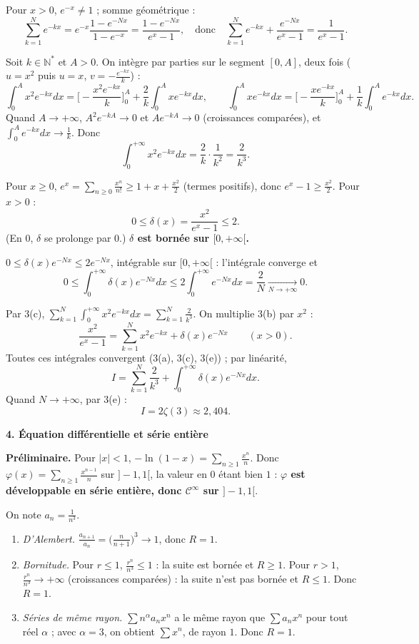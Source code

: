 \documentclass[a4paper,11pt]{article}
\numberwithin{equation}{section}
\numberwithin{figure}{section}
\numberwithin{table}{section}
\theoremstyle{enonce}
\theoremstyle{exemple}
\theoremstyle{remarque}
\newcommand{\N}{\mathbb{N}}
\newcommand{\Partie}[1]{\par\needspace{5\baselineskip}\vspace{1.1em}\noindent
  {\sffamily\bfseries\large\color{Bleu}#1}\par\vspace{2pt}{\color{Filet}\rule{\linewidth}{0.4pt}}\par\smallskip}
\newcommand{\Q}[1]{\par\needspace{3\baselineskip}\medskip\noindent{\sffamily\bfseries\color{Bleu}#1}\enspace}
\begin{document}
\Q{3(b)} Pour $x>0$, $e^{-x}\neq1$ ; somme géométrique :
\[\sum_{k=1}^Ne^{-kx}=e^{-x}\frac{1-e^{-Nx}}{1-e^{-x}}=\frac{1-e^{-Nx}}{e^x-1},\quad\text{donc}\quad
\sum_{k=1}^Ne^{-kx}+\frac{e^{-Nx}}{e^x-1}=\frac1{e^x-1}.\]

\Q{3(c)} Soit $k\in\N^*$ et $A>0$. On intègre par parties sur le segment $[0,A]$, deux fois ($u=x^2$ puis $u=x$, $v=-\frac{e^{-kx}}k$) :
\[\int_0^Ax^2e^{-kx}dx=\Big[-\frac{x^2e^{-kx}}k\Big]_0^A+\frac2k\int_0^Axe^{-kx}dx,\qquad
\int_0^Axe^{-kx}dx=\Big[-\frac{xe^{-kx}}k\Big]_0^A+\frac1k\int_0^Ae^{-kx}dx .\]
Quand $A\to+\infty$, $A^2e^{-kA}\to0$ et $Ae^{-kA}\to0$ (croissances comparées), et $\int_0^Ae^{-kx}dx\to\frac1k$. Donc
\[\int_0^{+\infty}x^2e^{-kx}dx=\frac2k\cdot\frac1{k^2}=\boxed{\frac2{k^3}}.\]

\Q{3(d)} Pour $x\geq0$, $e^x=\sum_{n\geq0}\frac{x^n}{n!}\geq1+x+\frac{x^2}2$ (termes positifs), donc $e^x-1\geq\frac{x^2}2$. Pour $x>0$ :
\[0\leq\delta(x)=\frac{x^2}{e^x-1}\leq2 .\]
(En $0$, $\delta$ se prolonge par $0$.) \textbf{$\delta$ est bornée sur $[0,+\infty[$.}

\Q{3(e)} $0\leq\delta(x)e^{-Nx}\leq2e^{-Nx}$, intégrable sur $[0,+\infty[$ : l'intégrale converge et
\[0\leq\int_0^{+\infty}\delta(x)e^{-Nx}dx\leq2\int_0^{+\infty}e^{-Nx}dx=\frac2N\xrightarrow[N\to+\infty]{}0 .\]

\Q{3(f)} Par 3(c), $\sum_{k=1}^N\int_0^{+\infty}x^2e^{-kx}dx=\sum_{k=1}^N\frac2{k^3}$. On multiplie 3(b) par $x^2$ :
\[\frac{x^2}{e^x-1}=\sum_{k=1}^Nx^2e^{-kx}+\delta(x)e^{-Nx}\qquad(x>0).\]
Toutes ces intégrales convergent (3(a), 3(c), 3(e)) ; par linéarité,
\[I=\sum_{k=1}^N\frac2{k^3}+\int_0^{+\infty}\delta(x)e^{-Nx}dx .\]
Quand $N\to+\infty$, par 3(e) : \[\boxed{I=2\zeta(3)}\approx2{,}404 .\]

\Partie{4. Équation différentielle et série entière}

\textbf{Préliminaire.} Pour $|x|<1$, $-\ln(1-x)=\sum_{n\geq1}\frac{x^n}n$. Donc $\varphi(x)=\sum_{n\geq1}\frac{x^{n-1}}n$ sur $]-1,1[$, la valeur en
$0$ étant bien $1$ : \textbf{$\varphi$ est développable en série entière, donc $\mathcal C^\infty$ sur $]-1,1[$}.

\Q{4(a)} On note $a_n=\frac1{n^3}$.
\begin{enumerate}[label=\emph{Méthode \arabic*.},leftmargin=0pt,itemindent=*,itemsep=3pt]
\item \emph{D'Alembert.} $\frac{a_{n+1}}{a_n}=\big(\frac n{n+1}\big)^3\to1$, donc $R=1$.
\item \emph{Bornitude.} Pour $r\leq1$, $\frac{r^n}{n^3}\leq1$ : la suite est bornée et $R\geq1$. Pour $r>1$, $\frac{r^n}{n^3}\to+\infty$
(croissances comparées) : la suite n'est pas bornée et $R\leq1$. Donc $R=1$.
\item \emph{Séries de même rayon.} $\sum n^\alpha a_nx^n$ a le même rayon que $\sum a_nx^n$ pour tout réel $\alpha$ ; avec $\alpha=3$, on
obtient $\sum x^n$, de rayon $1$. Donc $R=1$.
\end{enumerate}
\end{document}
